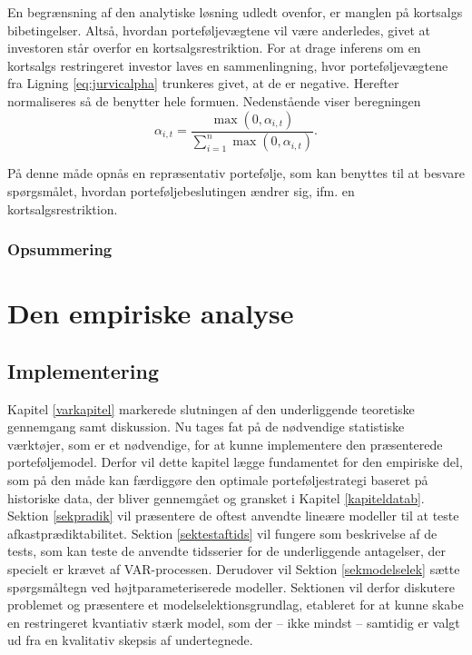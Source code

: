 \documentclass[
  a4paper,
  oneside]{memoir}
\begin{document}
En begrænsning af den analytiske løsning udledt ovenfor, er manglen på kortsalgs bibetingelser. Altså, hvordan porteføljevægtene vil være anderledes, givet at investoren står overfor en kortsalgsrestriktion. For at drage inferens om en kortsalgs restringeret investor laves en sammenlingning, hvor porteføljevægtene fra Ligning \eqref{eq:jurvicalpha} trunkeres givet, at de er negative. Herefter normaliseres så de benytter hele formuen. Nedenstående viser beregningen
\begin{equation}
\alpha_{i,t}=\frac{\max(0,\alpha_{i,t})}{\sum_{i=1}^n \max(0,\alpha_{i,t})}.\label{eq:kortsalgsrestr}
\end{equation}

På denne måde opnås en repræsentativ portefølje, som kan benyttes til at besvare spørgsmålet, hvordan porteføljebeslutingen ændrer sig, ifm. en kortsalgsrestriktion.

\hypertarget{opsummering-1}{%
\section{Opsummering}\label{opsummering-1}}

\part{Den empiriske analyse}

\hypertarget{imple}{%
\chapter{Implementering}\label{imple}}

Kapitel \ref{varkapitel} markerede slutningen af den underliggende teoretiske gennemgang samt diskussion. Nu tages fat på de nødvendige statistiske værktøjer, som er et nødvendige, for at kunne implementere den præsenterede porteføljemodel. Derfor vil dette kapitel lægge fundamentet for den empiriske del, som på den måde kan færdiggøre den optimale porteføljestrategi baseret på historiske data, der bliver gennemgået og gransket i Kapitel \ref{kapiteldatab}. Sektion \ref{sekpradik} vil præsentere de oftest anvendte lineære modeller til at teste afkastprædiktabilitet. Sektion \ref{sektestaftids} vil fungere som beskrivelse af de tests, som kan teste de anvendte tidsserier for de underliggende antagelser, der specielt er krævet af VAR-processen. Derudover vil Sektion \ref{sekmodelselek} sætte spørgsmåltegn ved højtparameteriserede modeller. Sektionen vil derfor diskutere problemet og præsentere et modelselektionsgrundlag, etableret for at kunne skabe en restringeret kvantiativ stærk model, som der -- ikke mindst -- samtidig er valgt ud fra en kvalitativ skepsis af undertegnede.
\end{document}
